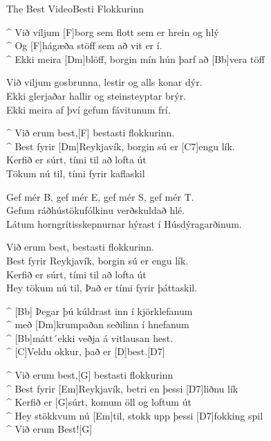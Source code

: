 \begin{song}{The Best Video}{Besti Flokkurinn}

\begin{guitar}
^ Við viljum [F]borg sem flott sem er hrein og hlý\\
^ Og [F]hágæða stöff sem að vit er í.\\
^ Ekki meira [Dm]blöff, borgin mín hún þarf að [Bb]vera töff\\
\end{guitar}

\begin{guitar}
Við viljum gosbrunna, lestir og alls konar dýr.\\
Ekki glerjaðar hallir og steinsteyptar brýr.\\
Ekki meira af því gefum fávitunum frí.\\
\end{guitar}

\begin{guitar}
^ Við erum best,[F] bestasti flokkurinn.\\
^ Best fyrir [Dm]Reykjavík, borgin sú er [C7]engu lík.\\
Kerfið er súrt, tími til að lofta út\\
Tökum nú til, tími fyrir kaflaskil\\
\end{guitar}

\begin{guitar}
Gef mér B, gef mér E, gef mér S, gef mér T.\\
Gefum ráðhústökufólkinu verðskuldað hlé.\\
Látum horngrítisskepnurnar hýrast í Húsdýragarðinum.\\
\end{guitar}

\begin{guitar}
Við erum best, bestasti flokkurinn.\\
Best fyrir Reykjavík, borgin sú er engu lík.\\
Kerfið er súrt, tími til að lofta út\\
Hey tökum nú til, Það er tími fyrir þáttaskil.\\
\end{guitar}

\begin{guitar}
^ [Bb] Þegar þú kúldrast inn í kjörklefanum\\
^ með [Dm]krumpaðan seðilinn í hnefanum\\
^ [Bb]mátt´ekki veðja á vitlausan hest.\\
^ [C]Veldu okkur, það er [D]best.[D7]\\
\end{guitar}

\begin{guitar}
^ Við erum best,[G] bestasti flokkurinn\\
^ Best fyrir [Em]Reykjavík, betri en þessi [D7]liðnu lík\\
^ Kerfið er [G]súrt, komum öll og loftum út\\
^ Hey stökkvum nú [Em]til, stokk upp þessi [D7]fokking spil\\
^ Við erum Best![G]\\
\end{guitar}

\end{song}
